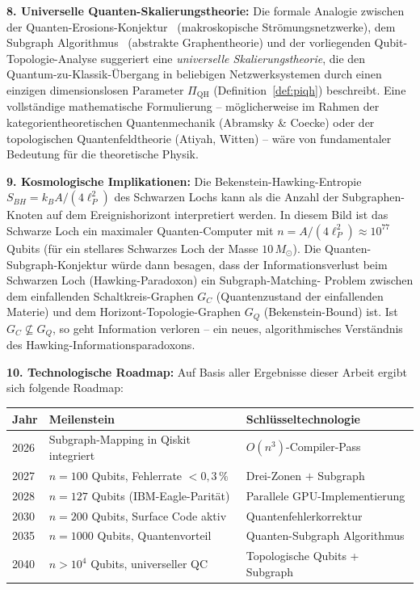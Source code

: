 ﻿\documentclass[a4paper,12pt]{article}
\theoremstyle{definition}
\begin{document}
\textbf{8. Universelle Quanten-Skalierungstheorie:}
Die formale Analogie zwischen der Quanten-Erosions-Konjektur~\cite{epp2026cnyn}
(makroskopische Strömungsnetzwerke), dem Subgraph Algorithmus~\cite{epp2026subgraph}
(abstrakte Graphentheorie) und der vorliegenden Qubit-Topologie-Analyse suggeriert
eine \emph{universelle Skalierungstheorie}, die den Quantum-zu-Klassik-Übergang
in beliebigen Netzwerksystemen durch einen einzigen dimensionslosen Parameter
$\Pi_\mathrm{QH}$ (Definition~\ref{def:piqh}) beschreibt. Eine vollständige
mathematische Formulierung -- möglicherweise im Rahmen der kategorientheoretischen
Quantenmechanik (Abramsky \& Coecke) oder der topologischen Quantenfeldtheorie
(Atiyah, Witten) -- wäre von fundamentaler Bedeutung für die theoretische Physik.

\textbf{9. Kosmologische Implikationen:}
Die Bekenstein-Hawking-Entropie $S_{BH} = k_B A/(4\ell_P^2)$ des Schwarzen Lochs
kann als die Anzahl der Subgraphen-Knoten auf dem Ereignishorizont interpretiert
werden. In diesem Bild ist das Schwarze Loch ein maximaler Quanten-Computer mit
$n = A/(4\ell_P^2) \approx 10^{77}$ Qubits (für ein stellares Schwarzes Loch der
Masse $10\,M_\odot$). Die Quanten-Subgraph-Konjektur würde dann besagen, dass der
Informationsverlust beim Schwarzen Loch (Hawking-Paradoxon) ein Subgraph-Matching-
Problem zwischen dem einfallenden Schaltkreis-Graphen $G_C$ (Quantenzustand der
einfallenden Materie) und dem Horizont-Topologie-Graphen $G_Q$ (Bekenstein-Bound)
ist. Ist $G_C \not\subseteq G_Q$, so geht Information verloren -- ein neues,
algorithmisches Verständnis des Hawking-Informationsparadoxons.

\textbf{10. Technologische Roadmap:}
Auf Basis aller Ergebnisse dieser Arbeit ergibt sich folgende Roadmap:
\begin{center}
\begin{tabular}{@{}lll@{}}
\toprule
\textbf{Jahr} & \textbf{Meilenstein} & \textbf{Schlüsseltechnologie} \\
\midrule
2026 & Subgraph-Mapping in Qiskit integriert & $O(n^3)$-Compiler-Pass \\
2027 & $n = 100$ Qubits, Fehlerrate $< 0{,}3\,\%$ & Drei-Zonen $+$ Subgraph \\
2028 & $n = 127$ Qubits (IBM-Eagle-Parität) & Parallele GPU-Implementierung \\
2030 & $n = 200$ Qubits, Surface Code aktiv & Quantenfehlerkorrektur \\
2035 & $n = 1000$ Qubits, Quantenvorteil & Quanten-Subgraph Algorithmus \\
2040 & $n > 10^4$ Qubits, universeller QC & Topologische Qubits + Subgraph \\
\bottomrule
\end{tabular}
\end{center}
\end{document}
